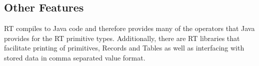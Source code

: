 \subsection{Other Features}
RT compiles to Java code and therefore provides many of the operators that Java provides 
for the RT primitive types. Additionally, there are RT libraries that facilitate printing 
of primitives, Records and Tables as well as interfacing with stored data in comma separated
value format.

